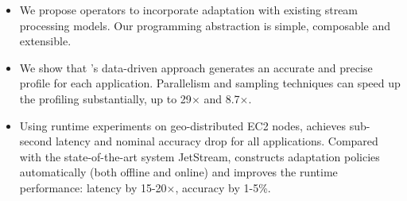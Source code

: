 \begin{itemize}[leftmargin=*, topsep=0pt, itemsep=-2pt]

\item We propose \maybe{} operators to incorporate adaptation with existing
  stream processing models. Our programming abstraction is simple, composable
  and extensible.

\item We show that \sysname{}'s data-driven approach generates an accurate and
  precise profile for each application. Parallelism and sampling techniques can
  speed up the profiling substantially, up to 29$\times$ and 8.7$\times$\@.

\item Using runtime experiments on geo-distributed EC2 nodes, \sysname{}
  achieves sub-second latency and nominal accuracy drop for all
  applications. Compared with the state-of-the-art system JetStream, \sysname{}
  constructs adaptation policies automatically (both offline and online) and
  improves the runtime performance: latency by 15-20$\times$, accuracy by 1-5\%.

\end{itemize}


